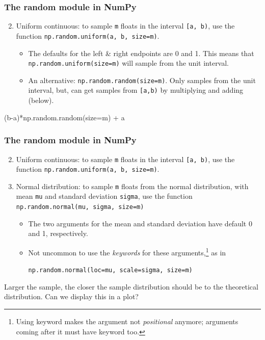 \documentclass{beamer}
\newenvironment{codeblock}
    {\hfill\begin{beamerboxesrounded}[lower=codecol, width=0.8\textwidth]
    \medskip

    }
    { 
    \end{beamerboxesrounded}\hfill
    }
\theoremstyle{example}
\newcommand{\ttt}[1]{{\small\texttt{#1}}}
\begin{document}
\begin{frame}[fragile]
\frametitle{The {\ttm random} module in NumPy}

\begin{enumerate}
    \setcounter{enumi}{1}
    \item Uniform continuous: to sample \ttt{m} floats in the interval \ttt{[a, b)}, use the function \ttt{np.random.uniform(a, b, size=m)}.
    \begin{itemize}
        \item The defaults for the left \& right endpoints are 0 and 1. This means that \ttt{np.random.uniform(size=m)} will sample from the unit interval.
        \item An alternative: \ttt{np.random.random(size=m)}. Only samples from the unit interval, but, can get samples from \ttt{[a,b)} by multiplying and adding (below).
    \end{itemize}
\end{enumerate}

\vspace*{12pt}
\begin{codeblock}

\begin{python}[numbers=none]
(b-a)*np.random.random(size=m) + a
\end{python}

\end{codeblock}

\end{frame}

\begin{frame}[fragile]
    \frametitle{The {\ttm random} module in NumPy}
    
    \begin{enumerate}
        \setcounter{enumi}{1}
        \item Uniform continuous: to sample \ttt{m} floats in the interval \ttt{[a, b)}, use the function \ttt{np.random.uniform(a, b, size=m)}.
        \item Normal distribution: to sample \ttt{m} floats from the normal distribution, with mean \ttt{mu} and standard deviation \ttt{sigma}, use the function \ttt{np.random.normal(mu, sigma, size=m)}
        \begin{itemize}
            \item The two arguments for the mean and standard deviation have default 0 and 1, respectively.
            \item Not uncommon to use the \emph{keywords} for these arguments,\footnote{Using keyword makes the argument not \emph{positional} anymore; arguments coming after it must have keyword too.} as in 
            \begin{center}\ttt{np.random.normal(loc=mu, scale=sigma, size=m)}\end{center}
        \end{itemize}
    \end{enumerate}

    Larger the sample, the closer the sample distribution should be to the theoretical distribution. Can we display this in a plot?
\end{frame}
    
\end{document}
